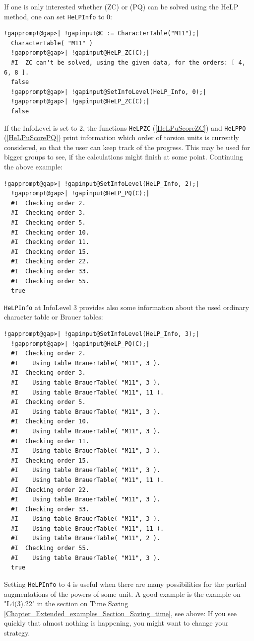 \documentclass[a4paper,11pt]{report}
\begin{document}
{{ If one is only interested whether (ZC) or (PQ) can be solved using the HeLP
method, one can set \texttt{HeLP{\textunderscore}Info} to 0: 
\begin{Verbatim}[commandchars=!@|,fontsize=\small,frame=single,label=Example]
  !gapprompt@gap>| !gapinput@C := CharacterTable("M11");|
  CharacterTable( "M11" )
  !gapprompt@gap>| !gapinput@HeLP_ZC(C);|
  #I  ZC can't be solved, using the given data, for the orders: [ 4, 6, 8 ].
  false
  !gapprompt@gap>| !gapinput@SetInfoLevel(HeLP_Info, 0);|
  !gapprompt@gap>| !gapinput@HeLP_ZC(C);|
  false
\end{Verbatim}
 If the InfoLevel is set to 2, the functions \texttt{HeLP{\textunderscore}ZC} (\ref{HeLPuScoreZC}) and \texttt{HeLP{\textunderscore}PQ} (\ref{HeLPuScorePQ}) print information which order of torsion units is currently considered, so
that the user can keep track of the progress. This may be used for bigger
groups to see, if the calculations might finish at some point. Continuing the
above example: 
\begin{Verbatim}[commandchars=!@|,fontsize=\small,frame=single,label=Example]
  !gapprompt@gap>| !gapinput@SetInfoLevel(HeLP_Info, 2);|
  !gapprompt@gap>| !gapinput@HeLP_PQ(C);|
  #I  Checking order 2.
  #I  Checking order 3.
  #I  Checking order 5.
  #I  Checking order 10.
  #I  Checking order 11.
  #I  Checking order 15.
  #I  Checking order 22.
  #I  Checking order 33.
  #I  Checking order 55.
  true
\end{Verbatim}
 \texttt{HeLP{\textunderscore}Info} at InfoLevel 3 provides also some information about the used ordinary
character table or Brauer tables: 
\begin{Verbatim}[commandchars=!@|,fontsize=\small,frame=single,label=Example]
  !gapprompt@gap>| !gapinput@SetInfoLevel(HeLP_Info, 3);|
  !gapprompt@gap>| !gapinput@HeLP_PQ(C);|
  #I  Checking order 2.
  #I    Using table BrauerTable( "M11", 3 ).
  #I  Checking order 3.
  #I    Using table BrauerTable( "M11", 3 ).
  #I    Using table BrauerTable( "M11", 11 ).
  #I  Checking order 5.
  #I    Using table BrauerTable( "M11", 3 ).
  #I  Checking order 10.
  #I    Using table BrauerTable( "M11", 3 ).
  #I  Checking order 11.
  #I    Using table BrauerTable( "M11", 3 ).
  #I  Checking order 15.
  #I    Using table BrauerTable( "M11", 3 ).
  #I    Using table BrauerTable( "M11", 11 ).
  #I  Checking order 22.
  #I    Using table BrauerTable( "M11", 3 ).
  #I  Checking order 33.
  #I    Using table BrauerTable( "M11", 3 ).
  #I    Using table BrauerTable( "M11", 11 ).
  #I    Using table BrauerTable( "M11", 2 ).
  #I  Checking order 55.
  #I    Using table BrauerTable( "M11", 3 ).
  true
\end{Verbatim}
 Setting \texttt{HeLP{\textunderscore}Info} to 4 is useful when there are many possibilities for the partial augmentations
of the powers of some unit. A good example is the example on
"L4(3).2\texttt{}2" in the section on Time Saving \ref{Chapter_Extended_examples_Section_Saving_time}, see above: If you see quickly that almost nothing is happening, you might
want to change your strategy.

}}
\end{document}
